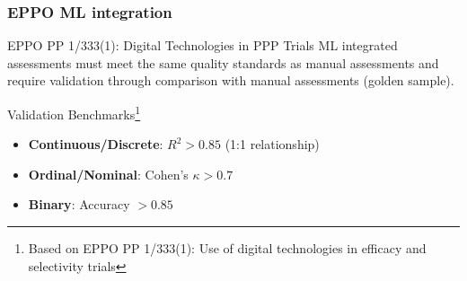 \documentclass[aspectratio=43]{beamer}
\begin{document}
\begin{frame}
    \frametitle{EPPO ML integration}
    
    \begin{block}{EPPO PP 1/333(1): Digital Technologies in PPP Trials}
        \small
        ML integrated assessments must meet the same quality standards as manual assessments and require validation through comparison with manual assessments (golden sample).
    \end{block}
    
    \begin{exampleblock}{\small Validation Benchmarks\footnote{\tiny Based on EPPO PP 1/333(1): Use of digital technologies in efficacy and selectivity trials}}
        \scriptsize
        \begin{itemize}
            \item \textbf{\large Continuous/Discrete}\large : $R^2 > 0.85$ (1:1 relationship)
            \item \textbf{\large Ordinal/Nominal}\large : Cohen's $\kappa > 0.7$
            \item \textbf{\large Binary}\large : Accuracy $> 0.85$
        \end{itemize}
    \end{exampleblock}
\end{frame}
\end{document}
